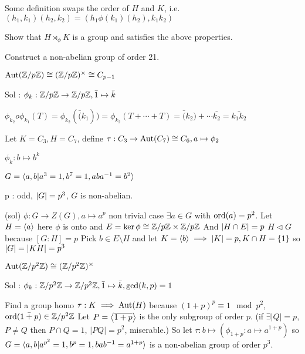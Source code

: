 \begin{remark}
Some definition swaps the order of $H$ and $K$, i.e. $(h_1, k_1) (h_2, k_2) = (h_1 \phi(k_1)(h_2), k_1 k_2)$
\end{remark}

\begin{exercise}
Show that $H \rtimes_\phi K$ is a group and satisfies the above properties.
\end{exercise}

\begin{example}
Construct a non-abelian group of order 21.
\end{example}

\begin{fact}
  $\Aut(\quot{\Zb}{p\Zb}) \cong (\quot{\Zb}{p\Zb})^\times \cong C_{p-1}$
\end{fact}
Sol : $\phi_k: \quot{\Zb}{p\Zb} \to \quot{\Zb}{p\Zb}, \bar{1} \mapsto \bar{k}$

$\phi_{k_2} o \phi_{k_1} (T) = \phi_{k_2}(\bar(k_1)) = \phi_{k_2}(T+\cdots+T)
= \bar(k_2) + \cdots \bar{k_2} = \bar{k_1 k_2}$

Let $K = C_3, H = C_7$, define $\tau : C_3 \to \Aut(C_7) \cong C_6, a \mapsto \phi_2$

$\phi_k : b \mapsto b^k$

$G = \gen{a, b | a^3=1, b^7=1, aba^{-1}=b^2}$

\begin{example}
  p : odd, $\abs{G} = p^3$, $G$ is non-abelian.
\end{example}
(sol)
$\phi: G \to Z(G), a \mapsto a^p$ non trivial
case $\exists a \in G $ with $\ord(a) = p^2$.
Let $H = \gen{a}$ here $\phi$ is onto and $E = \ker \phi \cong \quot{\Zb}{p\Zb} \times \quot{\Zb}{p\Zb}$
And $\abs{H \cap E} = p$
$H \lhd G$ because $[G: H]=p$
Pick $b \in E \setminus H$ and let $K = \gen{b} \implies \abs{K} = p, K \cap H = \{1\}$
so $\abs{G} = \abs{KH} = p^3$

\begin{fact}
  $\Aut(\quot{\Zb}{p^2 \Zb}) \cong (\quot{\Zb}{p^2 \Zb})^\times$
\end{fact}
Sol : $\phi_k: \quot{\Zb}{p^2\Zb} \to \quot{\Zb}{p^2\Zb}, \bar{1} \mapsto \bar{k}, \gcd(k, p) = 1$

Find a group homo $\tau : K \implies \Aut(H)$
because $(1+p)^p \equiv 1 \mod p^2$, $\ord(\bar{1+p}) \in \quot{\Zb}{p^2\Zb}$
Let $P = \gen*{\ob{1+p}}$ is the only subgroup of order $p$.
(if $\exists |Q| = p$, $P \neq Q$ then $P \cap Q = 1$, $|PQ| = p^2$, miserable.)
So let $\tau : b \mapsto (\phi_{1+p} : a \mapsto a^{1+p})$
so $G = \gen{a, b | a^{p^2}=1, b^p = 1, bab^{-1} = a^{1+p}}$ is a non-abelian group of order $p^3$.

